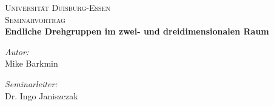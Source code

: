 
\begin{titlepage}
\begin{center}


\textsc{\LARGE Universität Duisburg-Essen}\\[1.5cm]

\textsc{\Large Seminarvortrag}\\[0.5cm]

{ \huge \bfseries Endliche Drehgruppen im zwei- und dreidimensionalen Raum \\[0.4cm] }

\begin{minipage}{0.4\textwidth}
\begin{flushleft} \large
\emph{Autor:}\\
Mike Barkmin
\end{flushleft}
\end{minipage}
\begin{minipage}{0.4\textwidth}
\begin{flushright} \large
\emph{Seminarleiter:} \\
Dr. Ingo Janiszczak
\end{flushright}
\end{minipage}

\vfill

\setcounter{tocdepth}{1}
\tableofcontents
\end{center}
\end{titlepage}
